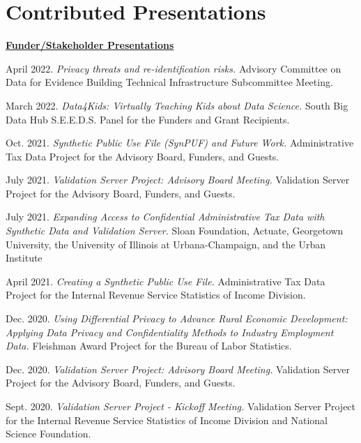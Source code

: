 \documentclass[11pt, letterpaper, roman]{moderncv} %
\begin{document}
\section{Contributed Presentations}
\underline{\textbf{\large Funder/Stakeholder Presentations}}\normalsize
\vspace{4pt}
\begin{etaremune}[topsep=0pt, itemsep=4pt, partopsep=0pt, parsep=0pt]
    \item April 2022. \textit{Privacy threats and re-identification risks.} Advisory Committee on Data for Evidence Building Technical Infrastructure Subcommittee Meeting.
    
    \item March 2022. \textit{Data4Kids: Virtually Teaching Kids about Data Science.} South Big Data Hub S.E.E.D.S. Panel for the Funders and Grant Recipients.
    
    \item Oct. 2021. \textit{Synthetic Public Use File (SynPUF) and Future Work.} Administrative Tax Data Project for the Advisory Board, Funders, and Guests.
    
    \item July 2021. \textit{Validation Server Project: Advisory Board Meeting.} Validation Server Project for the Advisory Board, Funders, and Guests.
    
    \item July 2021. \textit{Expanding Access to Confidential Administrative Tax Data with Synthetic Data and Validation Server.} Sloan Foundation, Actuate, Georgetown University, the University of Illinois at Urbana-Champaign, and the Urban Institute
    
    \item April 2021. \textit{Creating a Synthetic Public Use File.} Administrative Tax Data Project for the Internal Revenue Service Statistics of Income Division.

    \item Dec. 2020. \textit{Using Differential Privacy to Advance Rural Economic Development: Applying Data Privacy and Confidentiality Methods to Industry Employment Data.} Fleishman Award Project for the Bureau of Labor Statistics.
    
    \item Dec. 2020. \textit{Validation Server Project: Advisory Board Meeting.} Validation Server Project for the Advisory Board, Funders, and Guests.
    
    \item Sept. 2020. \textit{Validation Server Project - Kickoff Meeting.} Validation Server Project for the Internal Revenue Service Statistics of Income Division and National Science Foundation.
    

\end{etaremune}
\end{document}
